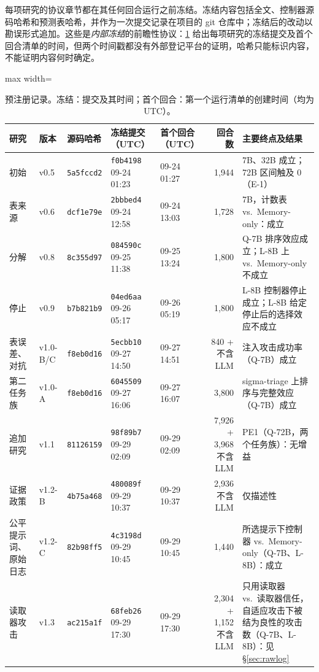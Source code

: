 每项研究的协议章节都在其任何回合运行之前冻结。冻结内容包括全文、控制器源码哈希和预测表哈希，并作为一次提交记录在项目的 git 仓库中；冻结后的改动以勘误形式追加。这些是\emph{内部冻结}的前瞻性协议：\cref{tab:prereg} 给出每项研究的冻结提交及首个回合清单的时间，但两个时间戳都没有外部登记平台的证明，哈希只能标识内容，不能证明内容何时确定。

\begin{table}[t]
  \caption{预注册记录。冻结：提交及其时间；首个回合：第一个运行清单的创建时间（均为 UTC）。}
  \label{tab:prereg}
  \centering\small
  \begin{adjustbox}{max width=\textwidth}
  \begin{tabular}{lllllrl}
    \toprule
    研究 & 版本 & 源码哈希 & 冻结提交（UTC） & 首个回合（UTC） & 回合数 & 主要终点及结果 \\
    \midrule
    初始 & v0.5 & \texttt{5a5fccd2} & \texttt{f0b4198} 09-24 01:23 & 09-24 01:27 & 1{,}944 & 7B、32B 成立；72B 区间触及 0（E-1） \\
    表来源 & v0.6 & \texttt{dcf1e79e} & \texttt{2bbbed4} 09-24 12:58 & 09-24 13:03 & 1{,}728 & 7B，计数表 vs.\ Memory-only：成立 \\
    分解 & v0.8 & \texttt{8c355d97} & \texttt{084590c} 09-25 11:38 & 09-25 13:24 & 1{,}800 & Q-7B 排序效应成立；L-8B 上 \hesp{} vs.\ Memory-only 不成立 \\
    停止 & v0.9 & \texttt{b7b821b9} & \texttt{04ed6aa} 09-26 05:17 & 09-26 05:19 & 1{,}800 & L-8B 控制器停止成立；L-8B 给定停止后的选择效应不成立 \\
    表误差、对抗 & v1.0-B/C & \texttt{f8eb0d16} & \texttt{5ecbb10} 09-27 14:50 & 09-27 14:51 & 840 + 不含 LLM & 注入攻击成功率（Q-7B）成立 \\
    第二任务族 & v1.0-A & \texttt{f8eb0d16} & \texttt{6045509} 09-27 16:06 & 09-27 16:07 & 3{,}800 & sigma-triage 上排序与完整效应（Q-7B）成立 \\
    追加研究 & v1.1 & \texttt{81126159} & \texttt{98f89b7} 09-29 02:09 & 09-29 02:09 & 7{,}926 + 3{,}968 不含 LLM & PE1（Q-72B，两个任务族）：无增益 \\
    证据政策 & v1.2-B & \texttt{4b75a468} & \texttt{480089f} 09-29 10:37 & 09-29 10:37 & 2{,}936 不含 LLM & 仅描述性 \\
    公平提示词、原始日志 & v1.2-C & \texttt{82b98ff5} & \texttt{4c3198d} 09-29 10:45 & 09-29 10:45 & 1{,}440 & 所选提示下控制器 vs.\ Memory-only（Q-7B、L-8B）：成立 \\
    读取器攻击 & v1.3 & \texttt{ac215a1f} & \texttt{68feb26} 09-29 17:30 & 09-29 17:30 & 2{,}304 + 1{,}152 不含 LLM & 只用读取器 vs.\ 读取器信任，自适应攻击下被结为良性的攻击数（Q-7B、L-8B）：见 \S\ref{sec:rawlog} \\
    \bottomrule
  \end{tabular}
  \end{adjustbox}
\end{table}


